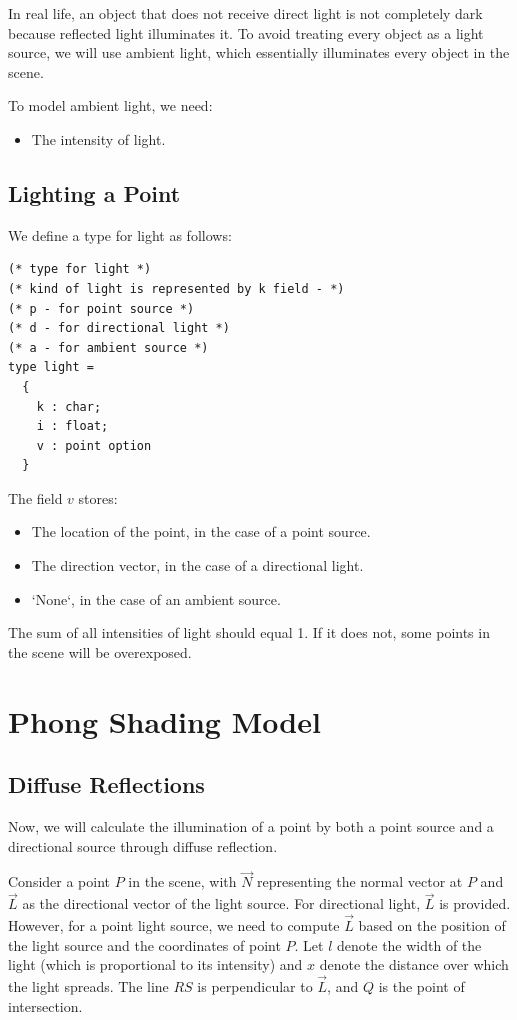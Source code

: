 \documentclass[conference]{IEEEtran}
\begin{document}
In real life, an object that does not receive direct light is not completely dark because reflected light illuminates it. To avoid treating every object as a light source, we will use ambient light, which essentially illuminates every object in the scene.

To model ambient light, we need:
\begin{itemize}
    \item The intensity of light.
\end{itemize}

\subsection{Lighting a Point}

We define a type for light as follows:

\begin{lstlisting}
(* type for light *)
(* kind of light is represented by k field - *)
(* p - for point source *)
(* d - for directional light *)
(* a - for ambient source *)
type light = 
  {
    k : char;
    i : float;
    v : point option
  }
\end{lstlisting}

The field $v$ stores:
\begin{itemize}
    \item The location of the point, in the case of a point source.
    \item The direction vector, in the case of a directional light.
    \item `None`, in the case of an ambient source.
\end{itemize}

The sum of all intensities of light should equal 1. If it does not, some points in the scene will be overexposed.
\section{Phong Shading Model}


 
\subsection{Diffuse Reflections}

Now, we will calculate the illumination of a point by both a point source and a directional source through diffuse reflection.

Consider a point $ P $ in the scene, with $ \vec{N} $ representing the normal vector at $ P $ and $ \vec{L} $ as the directional vector of the light source. For directional light, $ \vec{L} $ is provided. However, for a point light source, we need to compute $ \vec{L} $ based on the position of the light source and the coordinates of point $ P $. Let $ l $ denote the width of the light (which is proportional to its intensity) and $ x $ denote the distance over which the light spreads. The line $ RS $ is perpendicular to $ \vec{L} $, and $ Q $ is the point of intersection.
\end{document}

